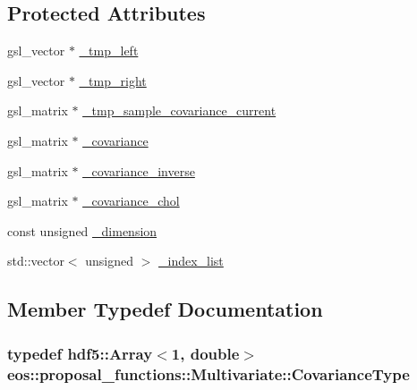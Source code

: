 \subsection*{Protected Attributes}
\begin{DoxyCompactItemize}
\item 
gsl\_\-vector $\ast$ \hyperlink{classeos_1_1proposal__functions_1_1Multivariate_a642356a5bf54154da5730ffca4ee0c7f}{\_\-tmp\_\-left}
\item 
gsl\_\-vector $\ast$ \hyperlink{classeos_1_1proposal__functions_1_1Multivariate_a6a8e41ac55083ca3eebbfc65dce32b5e}{\_\-tmp\_\-right}
\item 
gsl\_\-matrix $\ast$ \hyperlink{classeos_1_1proposal__functions_1_1Multivariate_a37d4d1ebe9b21fb87da6976d7b08f962}{\_\-tmp\_\-sample\_\-covariance\_\-current}
\item 
gsl\_\-matrix $\ast$ \hyperlink{classeos_1_1proposal__functions_1_1Multivariate_ad563d0d650e7cbd130c0229440c172fe}{\_\-covariance}
\item 
gsl\_\-matrix $\ast$ \hyperlink{classeos_1_1proposal__functions_1_1Multivariate_a91646502fcd9f17890b08ff8928e36f3}{\_\-covariance\_\-inverse}
\item 
gsl\_\-matrix $\ast$ \hyperlink{classeos_1_1proposal__functions_1_1Multivariate_a4ed7faa7ef374c0b6fbc065a45ce34d3}{\_\-covariance\_\-chol}
\item 
const unsigned \hyperlink{classeos_1_1proposal__functions_1_1Multivariate_ab5e327644edef3b9c8658e2cdd3d2772}{\_\-dimension}
\item 
std::vector$<$ unsigned $>$ \hyperlink{classeos_1_1proposal__functions_1_1Multivariate_a6626ace5861eeba7b92ea9ed4c6095ee}{\_\-index\_\-list}
\end{DoxyCompactItemize}


\subsection{Member Typedef Documentation}
\hypertarget{classeos_1_1proposal__functions_1_1Multivariate_ae7eae33da3e528eea02bd653e83f865a}{
\subsubsection[{CovarianceType}]{\setlength{\rightskip}{0pt plus 5cm}typedef {\bf hdf5::Array}$<$1, double$>$ {\bf eos::proposal\_\-functions::Multivariate::CovarianceType}}}
\label{classeos_1_1proposal__functions_1_1Multivariate_ae7eae33da3e528eea02bd653e83f865a}


